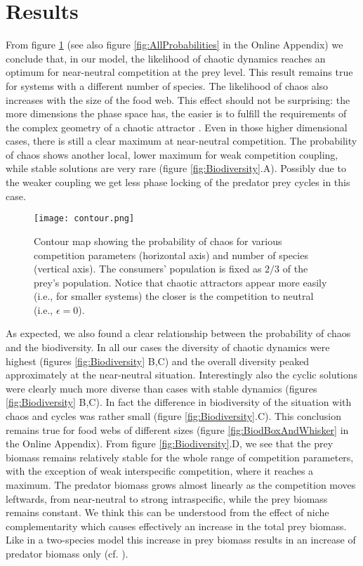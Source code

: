 \section{Results}
\label{sec:Results}
From figure \ref{fig:Contour} (see also figure \ref{fig:AllProbabilities} in the Online Appendix) we conclude that, in our model, the likelihood of chaotic dynamics reaches an optimum for near-neutral competition at the prey level. This result remains true for systems with a different number of species. The likelihood of chaos also increases with the size of the food web. This effect should not be surprising: the more dimensions the phase space has, the easier is to fulfill the requirements of the complex geometry of a chaotic attractor \citep{Strogatz1994}. Even in those higher dimensional cases, there is still a clear maximum at near-neutral competition. The probability of chaos shows another local, lower maximum for weak competition coupling, while stable solutions are very rare (figure \ref{fig:Biodiversity}.A). Possibly due to the weaker coupling we get less phase locking of the predator prey cycles in this case.

\begin{figure}
	\begin{center}
		\texttt{[image: contour.png]}
	\end{center}
	\caption{Contour map showing the probability of chaos for various competition parameters (horizontal axis) and number of species (vertical axis). The consumers' population is fixed as $ 2/3 $ of the prey's population. Notice that chaotic attractors appear more easily (i.e., for smaller systems) the closer is the competition to neutral (i.e., $ \epsilon = 0 $).}
	\label{fig:Contour}
\end{figure}

As expected, we also found a clear relationship between the probability of chaos and the biodiversity. In all our cases the diversity of chaotic dynamics were highest (figures \ref{fig:Biodiversity} B,C) and the overall diversity peaked approximately at the near-neutral situation. Interestingly also the cyclic solutions were clearly much more diverse than cases with stable dynamics (figures \ref{fig:Biodiversity} B,C). In fact the difference in biodiversity of the situation with chaos and cycles was rather small (figure \ref{fig:Biodiversity}.C). This conclusion remains true for food webs of different sizes (figure \ref{fig:BiodBoxAndWhisker} in the Online Appendix). From figure \ref{fig:Biodiversity}.D, we see that the prey biomass remains relatively stable for the whole range of competition parameters, with the exception of weak interspecific competition, where it reaches a maximum. The predator biomass grows almost linearly as the competition moves leftwards, from near-neutral to strong intraspecific, while the prey biomass remains constant. We think this can be understood from the effect of niche complementarity which causes effectively an increase in the total prey biomass. Like in a two-species model this increase in prey biomass results in an increase of predator biomass only (cf. \citet{Rosenzweig1963}).

